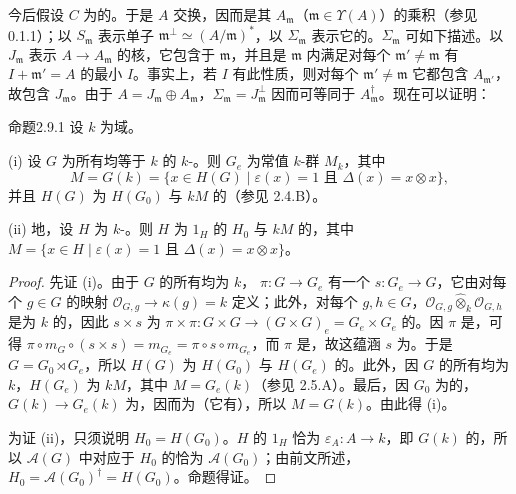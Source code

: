 今后假设 $C$ 为的。于是 $A$ 交换，因而是其 $A_{\mathfrak m}$（$\mathfrak m\in\Upsilon(A)$）的乘积（参见 0.1.1）；以 $S_{\mathfrak m}$ 表示单子 $\mathfrak m^\perp\simeq(A/\mathfrak m)^*$，以 $\Sigma_{\mathfrak m}$ 表示它的。$\Sigma_{\mathfrak m}$ 可如下描述。以 $J_{\mathfrak m}$ 表示 $A\to A_{\mathfrak m}$ 的核，它包含于 $\mathfrak m$，并且是 $\mathfrak m$ 内满足对每个 $\mathfrak m'\ne\mathfrak m$ 有 $I+\mathfrak m'=A$ 的最小 $I$。事实上，若 $I$ 有此性质，则对每个 $\mathfrak m'\ne\mathfrak m$ 它都包含 $A_{\mathfrak m'}$，故包含 $J_{\mathfrak m}$。由于 $A=J_{\mathfrak m}\oplus A_{\mathfrak m}$，$\Sigma_{\mathfrak m}=J_{\mathfrak m}^\perp$ 因而可等同于 $A_{\mathfrak m}^\dagger$。现在可以证明：
\begin{SGAresult}{命题}{2.9.1}
设 $k$ 为域。

(i) 设 $G$ 为所有均等于 $k$ 的 $k$-。则 $G_e$ 为常值 $k$-群 $M_k$，其中
\[
M=G(k)=\{x\in H(G)\mid\varepsilon(x)=1\text{ 且 }\Delta(x)=x\otimes x\},
\]
并且 $H(G)$ 为 $H(G_0)$ 与 $kM$ 的（参见 2.4.B）。

(ii) 地，设 $H$ 为 $k$-。则 $H$ 为 $1_H$ 的 $H_0$ 与 $kM$ 的，其中 $M=\{x\in H\mid\varepsilon(x)=1\text{ 且 }\Delta(x)=x\otimes x\}$。
\end{SGAresult}
\begin{proof}
先证 (i)。由于 $G$ 的所有均为 $k$， $\pi:G\to G_e$ 有一个 $s:G_e\to G$，它由对每个 $g\in G$ 的映射 $\mathscr O_{G,g}\to\kappa(g)=k$ 定义；此外，对每个 $g,h\in G$，$\mathscr O_{G,g}\widehat\otimes_k\mathscr O_{G,h}$ 是为 $k$ 的，因此 $s\times s$ 为 $\pi\times\pi:G\times G\to(G\times G)_e=G_e\times G_e$ 的。因 $\pi$ 是，可得 $\pi\circ m_G\circ(s\times s)=m_{G_e}=\pi\circ s\circ m_{G_e}$，而 $\pi$ 是，故这蕴涵 $s$ 为。于是 $G=G_0\rtimes G_e$，所以 $H(G)$ 为 $H(G_0)$ 与 $H(G_e)$ 的。此外，因 $G$ 的所有均为 $k$，$H(G_e)$ 为 $kM$，其中 $M=G_e(k)$（参见 2.5.A）。最后，因 $G_0$ 为的， $G(k)\to G_e(k)$ 为，因而为（它有），所以 $M=G(k)$。由此得 (i)。

为证 (ii)，只须说明 $H_0=H(G_0)$。$H$ 的 $1_H$ 恰为 $\varepsilon_A:A\to k$，即 $G(k)$ 的，所以 $\mathscr A(G)$ 中对应于 $H_0$ 的恰为 $\mathscr A(G_0)$；由前文所述，$H_0=\mathscr A(G_0)^\dagger=H(G_0)$。命题得证。
\end{proof}

